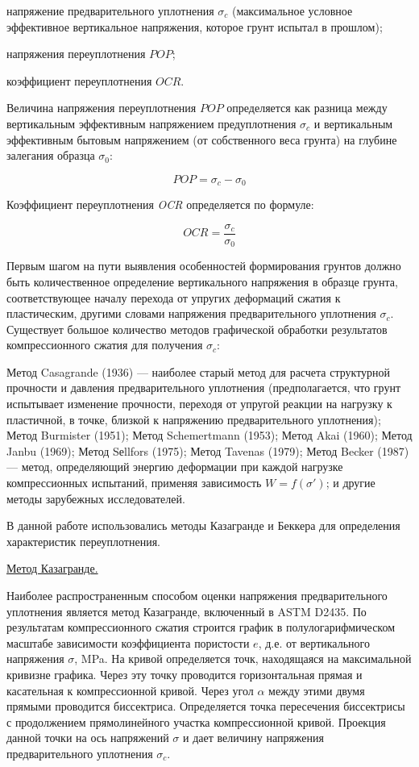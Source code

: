 напряжение предварительного уплотнения $\sigma_c$ 
(максимальное условное эффективное вертикальное напряжения, 
которое грунт испытал в прошлом);

напряжения переуплотнения $POP$;

коэффициент переуплотнения $OCR$.

Величина напряжения переуплотнения $POP$ определяется 
как разница между вертикальным эффективным напряжением 
предуплотнения $\sigma_c$ и вертикальным эффективным бытовым напряжением 
(от собственного веса грунта) на глубине залегания образца $\sigma_0$:

\[
   POP = \sigma_c - \sigma_0
\]

Коэффициент переуплотнения \textit{OCR} определяется по формуле:

\[
   OCR = \frac{\sigma_c}{\sigma_0}
\]

Первым шагом на пути выявления особенностей формирования грунтов должно быть количественное определение
вертикального напряжения в образце грунта, соответствующее началу перехода от упругих деформаций сжатия к пластическим,
другими словами напряжения предварительного уплотнения $\sigma_c$. 
Существует большое количество методов графической обработки 
результатов компрессионного сжатия для получения $\sigma_c$:

Метод Casagrande (1936) --- наиболее старый метод для расчета структурной 
прочности и давления предварительного уплотнения (предполагается, 
что грунт испытывает изменение прочности, переходя от упругой реакции на нагрузку 
к пластичной, в точке, близкой к напряжению предварительного уплотнения);
Метод Burmister (1951); Метод Schemertmann (1953); Метод Akai (1960);
Метод Janbu (1969); Метод Sеllfors (1975); Метод Tavenas (1979);
Метод Becker (1987) --- метод, определяющий энергию деформации
при каждой нагрузке компрессионных испытаний, применяя зависимость
\(W = f(\sigma')\); и другие методы зарубежных исследователей.
 
В данной работе использовались методы Казагранде и Беккера для определения характеристик 
переуплотнения.

\underline{Метод Казагранде.}

Наиболее распространенным способом оценки напряжения предварительного 
уплотнения является метод Казагранде, включенный в ASTM D2435. 
По результатам компрессионного сжатия строится график в полулогарифмическом 
масштабе зависимости коэффициента пористости $e$, д.е. от 
вертикального напряжения $\sigma$, \si{\mega\pascal}. 
На кривой определяется точк, находящаяся на максимальной кривизне 
графика. Через эту точку проводится горизонтальная прямая 
и касательная к компрессионной кривой. 
Через угол $\alpha$ между этими двумя прямыми проводится биссектриса. 
Определяется точка пересечения биссектрисы с продолжением прямолинейного 
участка компрессионной кривой. Проекция данной точки на ось напряжений $\sigma$
и дает величину напряжения предварительного уплотнения $\sigma_c$.

